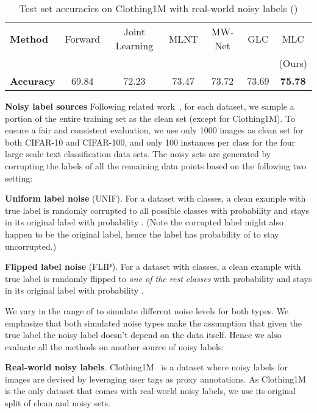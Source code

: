 \begin{table*}[h!]
  \small
  \centering
\begin{tabular}{lcccccc}\toprule
  \textbf{Method} & Forward & Joint Learning  & MLNT & MW-Net & GLC &MLC \\
   & \cite{patrini2017making} & \cite{tanaka2018joint}  & \cite{li2019learning} & \cite{shu2019meta} & \cite{hendrycks2018using} & (Ours) \\
  \midrule
  \textbf{Accuracy} & 69.84 & 72.23 & 73.47 & 73.72 &73.69 &\bf{75.78}\\
\bottomrule
\end{tabular}
\vspace{-0.1in}
\caption{Test set accuracies on Clothing1M with real-world noisy labels ()}
\label{tab:clothing1m}
\vspace{-0.1in}
\end{table*}


\textbf{Noisy label sources}
Following related work~\cite{hendrycks2018using,ren2018learning,shu2019meta}, for each dataset, we sample a
portion of the entire training set as the clean set (except for
Clothing1M). To ensure a fair and consistent evaluation, we use only
1000 images as clean set for both CIFAR-10 and CIFAR-100, and only 100
instances per class for the four large scale text classification data
sets. The noisy sets are generated by corrupting the
labels of all the remaining data points based on the following two
setting:

\textbf{Uniform label noise} (\textsf{UNIF}). For a dataset with 
classes, a clean example with true label  is randomly corrupted to all
possible classes  with  probability  and stays in its original
label with probability . (Note the corrupted label might also
happen to be the original label, hence the label has probability of
 to stay uncorrupted.)

\textbf{Flipped label noise} (\textsf{FLIP}). For a dataset with 
classes, a clean example with true label  is randomly flipped to
\textit{one of the rest  classes} with probability  and
stays in its original label with probability .



We vary  in the range of  to simulate different noise
levels for both types. We emphasize that both simulated noise types
make the assumption that given the true label the noisy label doesn't
depend on the data itself. Hence we also evaluate all the methods on
another source of noisy labels:

\textbf{Real-world noisy labels}. Clothing1M~\cite{xiao2015learning} is a dataset where noisy labels for images are devised by leveraging user tags as proxy annotations.  As Clothing1M is the only dataset that comes with real-world noisy labels, we use its original split of clean and noisy sets.

